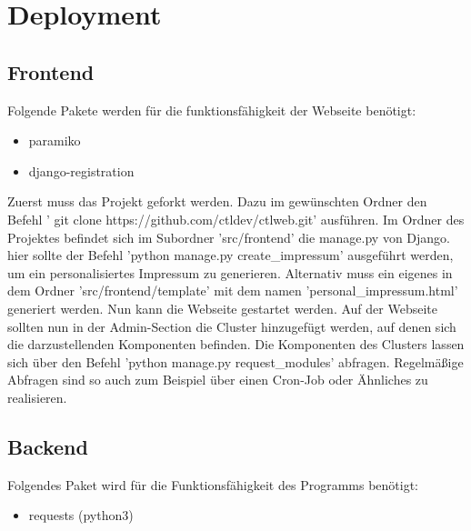 
\chapter{Deployment}
\section{Frontend}
Folgende Pakete werden für die funktionsfähigkeit der Webseite benötigt:
  \begin{itemize}
	\item paramiko
	\item django-registration
  \end{itemize}


Zuerst muss das Projekt geforkt werden. Dazu im gewünschten Ordner den Befehl '
git clone https://github.com/ctldev/ctlweb.git' ausführen. Im Ordner des
Projektes befindet sich im Subordner 'src/frontend' die manage.py von Django.
hier sollte der Befehl 'python manage.py create\_impressum' ausgeführt werden,
um ein personalisiertes Impressum zu generieren. Alternativ muss ein eigenes 
in dem Ordner 'src/frontend/template' mit dem namen
'personal\_impressum.html' generiert werden. Nun kann die Webseite gestartet
werden.
Auf der Webseite sollten nun in der Admin-Section die Cluster hinzugefügt werden,
auf denen sich die darzustellenden Komponenten befinden. Die Komponenten des
Clusters lassen sich über den Befehl 'python manage.py request\_modules'
abfragen. Regelmäßige Abfragen sind so auch zum Beispiel über einen Cron-Job
oder Ähnliches zu realisieren.
\section{Backend}
Folgendes Paket wird für die Funktionsfähigkeit des Programms benötigt:
\begin{itemize}
  \item requests (python3)
\end{itemize}
